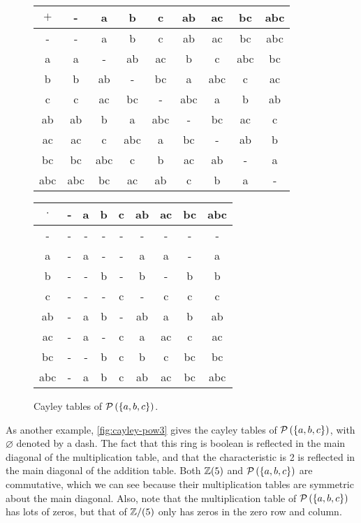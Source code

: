 \begin{figure}[h!]
\small
\begin{center}
\begin{tabular}{c|cccccccc}
\(+\) & -   & a   & b   & c   & ab  & ac  & bc  & abc \\ \hline
-     & -   & a   & b   & c   & ab  & ac  & bc  & abc \\
a     & a   & -   & ab  & ac  & b   & c   & abc & bc  \\
b     & b   & ab  & -   & bc  & a   & abc & c   & ac  \\
c     & c   & ac  & bc  & -   & abc & a   & b   & ab  \\
ab    & ab  & b   & a   & abc & -   & bc  & ac  & c   \\
ac    & ac  & c   & abc & a   & bc  & -   & ab  & b   \\
bc    & bc  & abc & c   & b   & ac  & ab  & -   & a   \\
abc   & abc & bc  & ac  & ab  & c   & b   & a   & -
\end{tabular}

\medskip\medskip

\begin{tabular}{c|cccccccc}
\(\cdot\) 
    & -   & a   & b   & c   & ab  & ac  & bc  & abc \\ \hline
-   & -   & -   & -   & -   & -   & -   & -   & -   \\
a   & -   & a   & -   & -   & a   & a   & -   & a   \\
b   & -   & -   & b   & -   & b   & -   & b   & b   \\
c   & -   & -   & -   & c   & -   & c   & c   & c   \\
ab  & -   & a   & b   & -   & ab  & a   & b   & ab  \\
ac  & -   & a   & -   & c   & a   & ac  & c   & ac  \\
bc  & -   & -   & b   & c   & b   & c   & bc  & bc  \\
abc & -   & a   & b   & c   & ab  & ac  & bc  & abc
\end{tabular}
\caption{Cayley tables of \(\mathcal{P}\left(\{a,b,c\}\right)\). \label{fig:cayley-pow3}}
\end{center}
\end{figure}
As another example, \autoref{fig:cayley-pow3} gives the cayley tables of \(\mathcal{P}\left(\{a,b,c\}\right)\), with \(\varnothing\) denoted by a dash. The fact that this ring is boolean is reflected in the main diagonal of the multiplication table, and that the characteristic is 2 is reflected in the main diagonal of the addition table. Both \(\mathbb{Z}(5)\) and \(\mathcal{P}\left(\{a,b,c\}\right)\) are commutative, which we can see because their multiplication tables are symmetric about the main diagonal. Also, note that the multiplication table of \(\mathcal{P}\left(\{a,b,c\}\right)\) has lots of zeros, but that of \(\mathbb{Z}/(5)\) only has zeros in the zero row and column.

